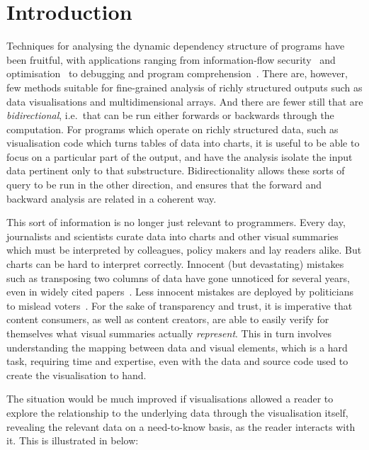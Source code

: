 \section{Introduction}

Techniques for analysing the dynamic dependency structure of programs have been fruitful, with applications ranging from information-flow security~\cite{sabelfeld03} and optimisation~\cite{kildall73} to debugging and program comprehension~\cite{weiser81,delucia96}. There are, however, few methods suitable for fine-grained analysis of richly structured outputs such as data visualisations and multidimensional arrays. And there are fewer still that are \emph{bidirectional}, i.e.~that can be run either forwards or backwards through the computation. For programs which operate on richly structured data, such as visualisation code which turns tables of data into charts, it is useful to be able to focus on a particular part of the output, and have the analysis isolate the input data pertinent only to that substructure. Bidirectionality allows these sorts of query to be run in the other direction, and ensures that the forward and backward analysis are related in a coherent way.

This sort of information is no longer just relevant to programmers. Every day, journalists and scientists curate data into charts and other visual summaries which must be interpreted by colleagues, policy makers and lay readers alike. But charts can be hard to interpret correctly. Innocent (but devastating) mistakes such as transposing two columns of data have gone unnoticed for several years, even in widely cited papers~\cite{miller06}. Less innocent mistakes are deployed by politicians to mislead voters~\cite{fullfact19}. For the sake of transparency and trust, it is imperative that content consumers, as well as content creators, are able to easily verify for themselves what visual summaries actually \emph{represent}. This in turn involves understanding the mapping between data and visual elements, which is a hard task, requiring time and expertise, even with the data and source code used to create the visualisation to hand.

The situation would be much improved if visualisations allowed a reader to explore the relationship to the underlying data through the visualisation itself, revealing the relevant data on a need-to-know basis, as the reader interacts with it. This is illustrated in  below:

